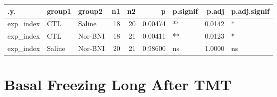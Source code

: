\documentclass[
]{book}
\begin{document}
\begin{tabular}{l|l|l|r|r|r|l|r|l}
\hline
.y. & group1 & group2 & n1 & n2 & p & p.signif & p.adj & p.adj.signif\\
\hline
exp\_index & CTL & Saline & 18 & 20 & 0.00474 & ** & 0.0142 & *\\
\hline
exp\_index & CTL & Nor-BNI & 18 & 21 & 0.00411 & ** & 0.0123 & *\\
\hline
exp\_index & Saline & Nor-BNI & 20 & 21 & 0.98600 & ns & 1.0000 & ns\\
\hline
\end{tabular}

\hypertarget{basal-freezing-long-after-tmt}{%
\chapter{Basal Freezing Long After TMT}\label{basal-freezing-long-after-tmt}}
\end{document}
